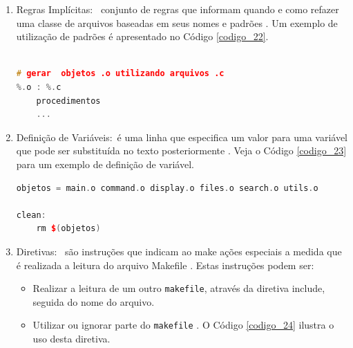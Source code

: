 \begin{enumerate}
    \item Regras Implícitas: \
 conjunto de regras que informam quando e como refazer uma classe de arquivos
 baseadas em seus nomes e padrões \cite[pág. 11]{ref45}. Um exemplo de utilização de 
 padrões é apresentado no Código \ref{codigo_22}. \\ \cite[pág. 19]{ref45}
        
    \begin{lstlisting}[language=C++,caption={ 
                                     Utilização de padrões no \texttt{makefile}},
                                                        label=codigo_22]

# gerar  objetos .o utilizando arquivos .c
%.o : %.c
    procedimentos
    ...

    \end{lstlisting}


    \item Definição de Variáveis:\
 é uma linha que especifica um valor para uma variável que pode ser substituída no
 texto posteriormente \cite[pág. 111]{ref43}. Veja o Código \ref{codigo_23} para um exemplo de 
definição de variável.

    \begin{lstlisting}[language=C++,caption={ 
                                     Definição e utilização de variável},
                                                         label=codigo_23]
objetos = main.o command.o display.o files.o search.o utils.o

clean:
    rm $(objetos)
    \end{lstlisting}


    \item Diretivas: \
são instruções que indicam ao make ações especiais a medida que é realizada a leitura do
 arquivo Makefile \cite[pág. 22]{ref45}. Estas instruções podem ser:

    \begin{itemize}
        \item Realizar a leitura de um outro \texttt{makefile}, através da diretiva include, seguida do nome do arquivo.
        \item Utilizar ou ignorar parte do \texttt{makefile} \cite[pág. 22]{ref43}. O Código \ref{codigo_24} ilustra o uso desta diretiva. 


    \begin{lstlisting}[language=C++,caption={ 
                                      Makefile com diretiva condicional},
                                                         label=codigo_24]


\end{lstlisting}
\end{itemize}
\end{enumerate}
